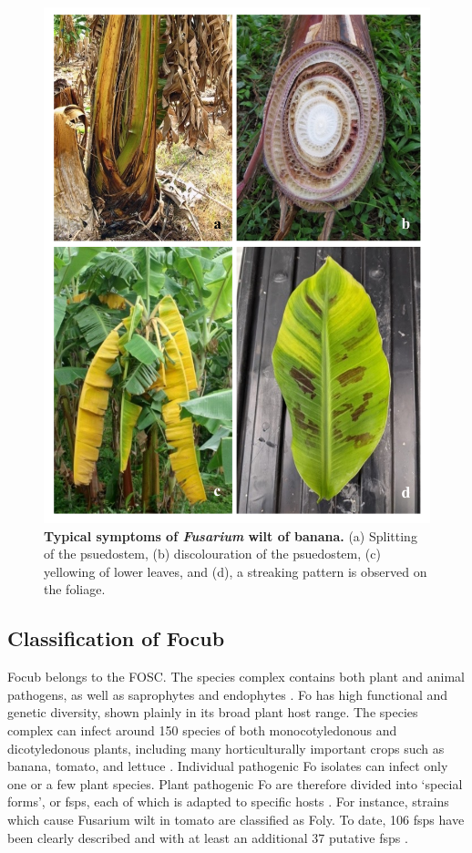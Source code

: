 \begin{figure}[pt!]
    \centering
    \includegraphics[width=15cm]{Figures/SymptomsofFoc.pdf}
    \caption[Typical symptoms of Fusarium  wilt of banana.]{\textbf{Typical symptoms of \textit{Fusarium} wilt of banana.} (a) Splitting of the psuedostem, (b) discolouration of the psuedostem, (c) yellowing of lower leaves, and (d), a streaking pattern is observed on the foliage.}
    \label{fig:FusariumWiltSymptoms}
\end{figure}

\subsection{Classification of \acl{Focub}}

\ac{Focub} belongs to the \ac{FOSC}. The species complex contains both plant and animal pathogens, as well as saprophytes and endophytes \parencite{Leslie2006}. \acs{Fo} has high functional and genetic diversity, shown plainly in its broad plant host range. The species complex can infect around 150 species of both monocotyledonous and dicotyledonous plants, including many horticulturally important crops such as banana, tomato, and lettuce \parencite{Edel-Hermann2019}.  Individual pathogenic \ac{Fo} isolates can infect only one or a few plant species. Plant pathogenic \ac{Fo} are therefore divided into ‘special forms’, or \acp{fsp}, each of which is adapted to specific hosts \parencite{Snyder1940}. For instance, strains which cause Fusarium wilt in tomato are classified as \acl{Foly}. To date, 106 \acp{fsp} have been clearly described and with at least an additional 37 putative \acp{fsp} \parencite{Edel-Hermann2019}.   

